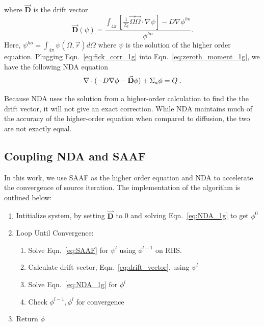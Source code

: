   where $\vec{\textbf{D}}$ is the drift vector
 \begin{equation}
  \vec{\textbf{D}} (\psi) = \frac{\int_{4\pi} [\frac{1}{\Sigma_t} \vec{\Omega} \vec{\Omega}\cdot \nabla \psi] - D \nabla \phi^{ho}}{\phi^{ho}}.
  \label{eq:drift_vector}
  \end{equation} 
Here, $\psi^{ho} = \int_{4\pi} \psi(\Omega, \vec{r}) d\Omega$ where $\psi$ is the solution of the higher order equation. Plugging Eqn.~\eqref{eq:fick_corr_1g} into Eqn.~\eqref{eq:zeroth_moment_1g}, we have the following NDA equation
  \begin{equation}
  \nabla\cdot(-D \nabla \phi - \vec{\bf D} \phi) + \Sigma_a \phi = Q \:. \label{eq:NDA_1g}
  \end{equation}
  
Because NDA uses the solution from a higher-order calculation to find the the drift vector, it will not give an exact correction. While NDA maintains much of the accuracy of the higher-order equation when compared to diffusion, the two are not exactly equal. 


\subsection{Coupling NDA and SAAF}
In this work, we use SAAF as the higher order equation and NDA to accelerate the convergence of source iteration. 
The implementation of the algorithm is outlined below:

\begin{enumerate}
    \item Intitialize system, by setting $\vec{\textbf{D}}$ to 0 and solving Eqn.~\eqref{eq:NDA_1g} to get $\phi^0$ 
    \item Loop Until Convergence:
        \begin{enumerate}
            \item Solve Eqn.~\eqref{eq:SAAF} for $\psi^l$ using $\phi^{l-1}$ on RHS.
            \item Calculate drift vector, Eqn.~\eqref{eq:drift_vector}, using $\psi^l$
            \item Solve Eqn.~\eqref{eq:NDA_1g} for $\phi^l$
            \item Check $\phi^{l-1}, \phi^l$ for convergence
        \end{enumerate}
    \item Return $\phi$
\end{enumerate}

